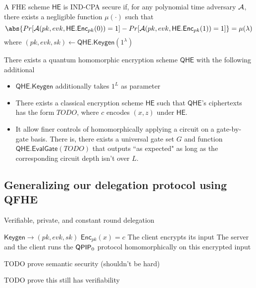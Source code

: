 \begin{dfn}
	A FHE scheme $\mathsf{HE}$ is IND-CPA secure if, for any polynomial time adversary $\mathcal{A}$, there exists a negligible function $\mu(\cdot)$ such that
	$$\abs{Pr[\cA(pk, evk, \mathsf{HE.Enc}_{pk}(0))=1]-Pr[\cA(pk, evk, \mathsf{HE.Enc}_{pk}(1))=1]}=\mu(\lambda)$$
	where $(pk, evk, sk)\leftarrow\mathsf{QHE.Keygen}(1^\lambda)$
\end{dfn}

\begin{thm}
	There exists a quantum homomorphic encryption scheme $\mathsf{QHE}$ with the following additional
	\begin{itemize}
		\item $\mathsf{QHE.Keygen}$ additionally takes $1^L$ as parameter
		\item There exists a classical encryption scheme $\mathsf{HE}$ such that $\mathsf{QHE}$'s ciphertexts has the form $TODO$, where $c$ encodes $(x, z)$ under $\mathsf{HE}$.
		\item It allow finer controls of homomorphically applying a circuit on a gate-by-gate basis. There is, there exists a universal gate set $G$ and function $\mathsf{QHE.EvalGate}(TODO)$ that outputs ``as expected"  as long as the corresponding  circuit depth isn't over $L$.
	\end{itemize}
\end{thm}

\subsection{Generalizing our delegation protocol using QFHE}

\begin{algorithm}
	\caption{Verifiable, private, and constant round delegation}
	\label{ProtoQPIP1}
	\begin{algorithmic}[1]
		\State $\mathsf{Keygen}\rightarrow(pk, evk, sk)$
		\State $\mathsf{Enc}_{pk}(x)=c$
		\State The client encrypts its input
		\State The server and the client runs the $\operatorname{\mathsf{QPIP}}_0$ protocol homomorphically on this encrypted input 
	\end{algorithmic}
\end{algorithm}

TODO prove semantic security (shouldn't be hard)

TODO prove this still has verifiability
